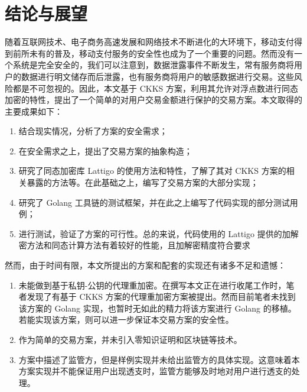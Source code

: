 \chapter{结论与展望}

随着互联网技术、电子商务高速发展和网络技术不断进化的大环境下，移动支付得到前所未有的普及，移动支付服务的安全性也成为了一个重要的问题。然而没有一个系统是完全安全的，我们可以注意到，数据泄露事件不断发生，常有服务商将用户的数据进行明文储存而后泄露，也有服务商将用户的敏感数据进行交易。这些风险都是不可忽视的。因此，本文基于 CKKS 方案，利用其允许对浮点数进行同态加密的特性，提出了一个简单的对用户交易金额进行保护的交易方案。本文取得的主要成果如下：

\begin{enumerate}
    \item 结合现实情况，分析了方案的安全需求；
    \item 在安全需求之上，提出了交易方案的抽象构造；
    \item 研究了同态加密库 Lattigo 的使用方法和特性，了解了其对 CKKS 方案的相关暴露的方法等。在此基础之上，编写了交易方案的大部分实现；
    \item 研究了 Golang 工具链的测试框架，并在此之上编写了代码实现的部分测试用例；
    \item 进行测试，验证了方案的可行性。总的来说，代码使用的 Lattigo 提供的加解密方法和同态计算方法有着较好的性能，且加解密精度符合要求
\end{enumerate}

然而，由于时间有限，本文所提出的方案和配套的实现还有诸多不足和遗憾：

\begin{enumerate}
    \item 未能做到基于私钥-公钥的代理重加密\cite{proxy_re_encryption}。在撰写本文正在进行收尾工作时，笔者发现了有基于 CKKS 方案的代理重加密方案被提出\cite{cryptoeprint:2017/410}。然而目前笔者未找到该方案的 Golang 实现，也暂时无如此的精力将该方案进行 Golang 的移植。若能实现该方案，则可以进一步保证本交易方案的安全性。
    \item 作为简单的交易方案，并未引入零知识证明和区块链等技术。
    \item 方案中描述了监管方，但是样例实现并未给出监管方的具体实现。这意味着本方案实现并不能保证用户出现透支时，监管方能够及时地对用户进行透支的处理。
\end{enumerate}
